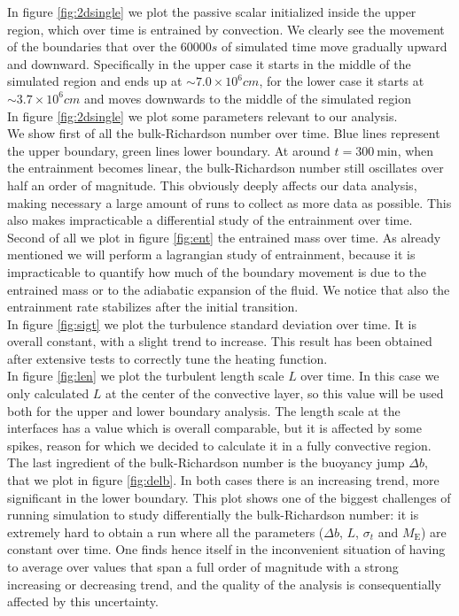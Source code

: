 In figure \ref{fig:2dsingle} we plot the passive scalar initialized inside the upper region, which over time is entrained by convection. We clearly see the movement of the boundaries that over the $60000 s$ of simulated time move gradually upward and downward. Specifically in the upper case it starts in the middle of the simulated region and ends up at $\sim 7.0 \times 10^{6} cm$, for the lower case it starts at $\sim 3.7 \times 10^{6} cm$ and moves downwards to the middle of the simulated region \\
In figure \ref{fig:2dsingle} we plot some parameters relevant to our analysis. \\
We show first of all the bulk-Richardson number over time. Blue lines represent the upper boundary, green lines lower boundary. At around $t=\mathrm{300 \ min}$, when the entrainment becomes linear, the bulk-Richardson number still oscillates over half an order of magnitude. This obviously deeply affects our data analysis, making necessary a large amount of runs to collect as more data as possible. This also makes impracticable a differential study of the entrainment over time. \\
Second of all we plot in figure \ref{fig:ent} the entrained mass over time. As already mentioned we will perform a lagrangian study of entrainment, because it is impracticable to quantify how much of the boundary movement is due to the entrained mass or to the adiabatic expansion of the fluid. We notice that also the entrainment rate stabilizes after the initial transition. \\
  In figure \ref{fig:sigt} we plot the turbulence standard deviation over time. It is overall constant, with a slight trend to increase. This result has been obtained after extensive tests to correctly tune the heating function.\\
  In figure \ref{fig:len} we plot the turbulent length scale $L$ over time. In this case we only calculated $L$ at the center of the convective layer, so this value will be used both for the upper and lower boundary analysis. The length scale at the interfaces has a value which is overall comparable, but it is affected by some spikes, reason for which we decided to calculate it in a fully convective region.\\ 
  The last ingredient of the bulk-Richardson number is the buoyancy jump $\Delta b$, that we plot in figure \ref{fig:delb}. In both cases there is an increasing trend, more significant in the lower boundary. This plot shows one of the biggest challenges of running simulation to study differentially the bulk-Richardson number: it is extremely hard to obtain a run where all the parameters ($\Delta b$, $L$, $\sigma_t$ and $M_{\mathrm{E}}$) are constant over time. One finds hence itself in the inconvenient situation of having to average over values that span a full order of magnitude with a strong increasing or decreasing trend, and the quality of the analysis is consequentially affected by this uncertainty.\\

